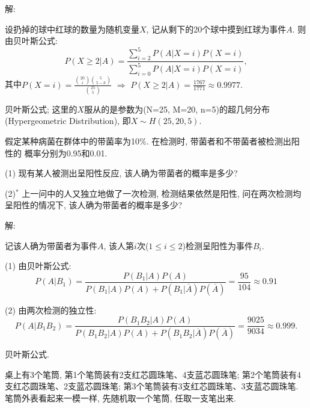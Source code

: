 \documentclass[standard]{ExBook}
\begin{document}
\begin{qitems}
\vspace{-5em}

    \begin{bbox}
解: 

设扔掉的球中红球的数量为随机变量$X$, 记从剩下的20个球中摸到红球为事件$A$. 则由贝叶斯公式:
$$P(X\geq2|A)=\frac{\sum\limits_{i=2}^{5}P(A|X=i)P(X=i)}{\sum\limits_{i=0}^{5}P(A|X=i)P(X=i)},$$
其中$P(X=i)=\displaystyle\frac{\binom{20}{i}\binom{5}{5-k}}{\binom{25}{5}}$ $\Rightarrow$ $P(X\geq2|A)=\frac{1767}{1771}\approx0.9977.$

\textcolor{themeColor}{\selectfont {} 贝叶斯公式; 这里的$X$服从的是参数为(N=25, M=20, n=5)的超几何分布(Hypergeometric Distribution), 即$X\sim H(25,20,5)$.}
    \end{bbox}

\vspace{-5em}

    \begin{bbox}
    \begin{shaded}
        \qitem
假定某种病菌在群体中的带菌率为10\%. 在检测时, 带菌者和不带菌者被检测出阳性的
概率分别为0.95和0.01.

(1) 现有某人被测出呈阳性反应, 该人确为带菌者的概率是多少?

(2)$^*$  上一问中的人又独立地做了一次检测, 检测结果依然是阳性, 问在两次检测均呈阳性的情况下, 该人确为带菌者的概率是多少?
    \end{shaded}
    \end{bbox}

\vspace{-5em}

    \begin{bbox}
解: 

记该人确为带菌者为事件$A$, 该人第$i$次($1 \leq i \leq 2$)检测呈阳性为事件$B_{i}$.

(1) 由贝叶斯公式:
$$P(A|B_{1})=\frac{P(B_{1}|A)P(A)}{P(B_{1}|A)P(A)+P(B_{1}|\overline{A})P(\overline{A})}=\frac{95}{104}\approx0.91$$

(2) 由两次检测的独立性:
$$P(A|B_{1}B_{2})=\frac{P(B_{1}B_{2}|A)P(A)}{P(B_{1}B_{2}|A)P(A)+P(B_{1}B_{2}|\overline{A})P(\overline{A})}=\frac{9025}{9034}\approx0.999.$$

\textcolor{themeColor}{\selectfont {} 贝叶斯公式.}
    \end{bbox}

\vspace{-5em}

    \begin{bbox}
    \begin{shaded}
        \qitem
桌上有3个笔筒, 第1个笔筒装有2支红芯圆珠笔、4支蓝芯圆珠笔; 第2个笔筒装有4支红芯圆珠笔、2支蓝芯圆珠笔; 第3个笔筒装有3支红芯圆珠笔、3支蓝芯圆珠笔. 笔筒外表看起来一模一样, 先随机取一个笔筒, 任取一支笔出来.


\end{shaded}
\end{bbox}
\end{qitems}
\end{document}
